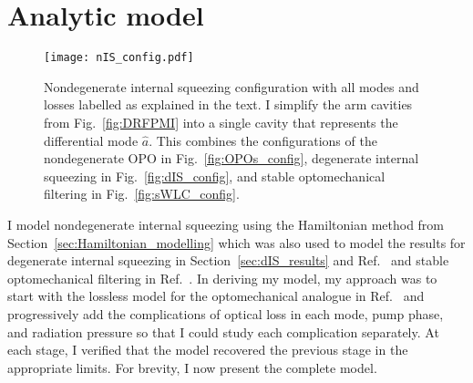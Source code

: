 \section{Analytic model}
\label{sec:nIS_model}

\begin{figure}[ht]
	\centering
	\texttt{[image: nIS\_config.pdf]}
	\caption{Nondegenerate internal squeezing configuration with all modes and losses labelled as explained in the text. I simplify the arm cavities from Fig.~\ref{fig:DRFPMI} into a single cavity that represents the differential mode $\hat a$. This combines the configurations of the nondegenerate OPO in Fig.~\ref{fig:OPOs_config}, degenerate internal squeezing in Fig.~\ref{fig:dIS_config}, and stable optomechanical filtering in Fig.~\ref{fig:sWLC_config}.}
	\label{fig:nIS_config}
\end{figure}

I model nondegenerate internal squeezing using the Hamiltonian method from Section~\ref{sec:Hamiltonian_modelling} which was also used to model the results for degenerate internal squeezing in Section~\ref{sec:dIS_results} and Ref.~\cite{korobkoQuantumExpanderGravitationalwave2019} and stable optomechanical filtering in Ref.~\cite{liBroadbandSensitivityImprovement2020}. %
In deriving my model, my approach was to start with the lossless model for the optomechanical analogue in Ref.~\cite{liBroadbandSensitivityImprovement2020} and progressively add the complications of optical loss in each mode, pump phase, and radiation pressure so that I could study each complication separately. At each stage, I verified that the model recovered the previous stage in the appropriate limits. For brevity, I now present the complete model.

